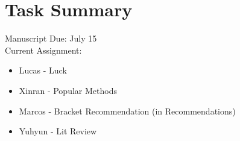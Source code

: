 \section*{Task Summary}
Manuscript Due: July 15\\
Current Assignment:
\begin{itemize}
\item Lucas - Luck
\item Xinran - Popular Methods
\item Marcos - Bracket Recommendation (in Recommendations) 
\item Yuhyun - Lit Review
\end{itemize}
